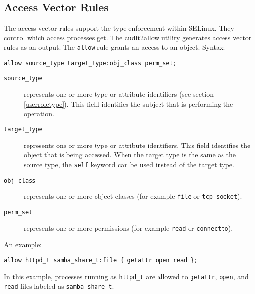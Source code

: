 \subsection{Access Vector Rules}
\label{avrules}
The access vector rules support the type enforcement within SELinux. They
control which access processes get. The audit2allow utility generates access
vector rules as an output. The \texttt{allow} rule grants an access to an
object. Syntax:
\begin{lstlisting}[language=te]
allow source_type target_type:obj_class perm_set;
\end{lstlisting}
\begin{description}
    \item [\texttt{source\_type}] represents one or more type or attribute
        identifiers (see section \ref{userroletype}). This field identifies the
        subject that is performing the operation.
    \item [\texttt{target\_type}] represents one or more type or attribute
        identifiers.  This field identifies the object that is being accessed.
        When the target type is the same as the source type, the \texttt{self}
        keyword can be used instead of the target type.
    \item [\texttt{obj\_class}] represents one or more object classes (for
        example \texttt{file} or \texttt{tcp\_socket}).
    \item [\texttt{perm\_set}] represents one or more permissions (for example
        \texttt{read} or \texttt{connectto}).
\end{description}
An example:
\begin{lstlisting}[language=te]
allow httpd_t samba_share_t:file { getattr open read };
\end{lstlisting}
In this example, processes running as \texttt{httpd\_t} are allowed to
\texttt{getattr}, \texttt{open}, and \texttt{read} files labeled as
\texttt{samba\_share\_t}.

